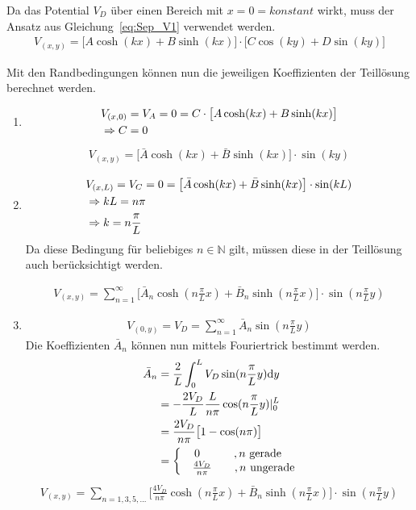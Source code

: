 Da das Potential $V_D$ über einen Bereich mit $x = 0 = konstant$ wirkt, muss der Ansatz aus Gleichung~\ref{eq:Sep_V1} verwendet werden. 
\begin{align}
	V_{(x,y)} = \bigl[A\cosh(kx) + B\sinh(kx)\bigr] \cdot \bigl[C\cos(ky) + D\sin(ky)\bigr]
\end{align}

Mit den Randbedingungen können nun die jeweiligen Koeffizienten der Teillösung berechnet werden. 

\begin{enumerate}
	\item \begin{align}
		&V_{(x,0)} = V_A = 0 = C \cdot \bigl[A \cosh(kx) + B \sinh(kx)\bigr] \\
		&\Rightarrow C = 0 \notag
	\end{align}
	\begin{align}
		V_{(x,y)} = \bigl[\bar{A} \cosh(kx) + \bar{B} \sinh(kx)\bigr] \cdot \sin(ky)
	\end{align}
	
	\item \begin{align}
		&V_{(x,L)} = V_C = 0 = \bigl[\bar{A} \cosh(kx) + \bar{B} \sinh(kx)\bigr] \cdot \sin(kL) \\
		&\Rightarrow kL = n \pi \notag \\
		&\Rightarrow k = n \frac{\pi}{L} \notag
	\end{align}
	Da diese Bedingung für beliebiges $n \in \mathbb{N}$ gilt, müssen diese in der Teillösung auch berücksichtigt werden. 
	
	\begin{align}
		V_{(x,y)} = \sum_{n = 1}^{\infty} \bigl[\bar{A}_n \cosh(n \frac{\pi}{L} x) + \bar{B}_n \sinh(n \frac{\pi}{L} x) \bigr] \cdot \sin(n \frac{\pi}{L} y)
	\end{align}
	
	\item \begin{align}
		V_{(0,y)} = V_D = \sum_{n = 1}^{\infty} \bar{A}_n \sin(n \frac{\pi}{L} y)
	\end{align}
	Die Koeffizienten $\bar{A}_n$ können nun mittels \glqq Fouriertrick\grqq{} bestimmt werden. 
	\begin{align}
		\bar{A}_n &= \frac{2}{L} \int_{0}^{L} V_D \sin(n \frac{\pi}{L} y) \mathrm{d}y \\
		&= - \frac{2V_D}{L} \frac{L}{n \pi} \cos(n \frac{\pi}{L} y) |_0^L \notag \\
		&= \frac{2V_D}{n \pi} \bigl[ 1 - \cos(n \pi) \bigr] \notag \\
		&= \biggl\{ \begin{matrix}
			0 \qquad \quad, n~\mathrm{gerade} \\
			~~~\frac{4V_D}{n \pi} \qquad , n~\mathrm{ungerade}
		\end{matrix} \notag
	\end{align}
	\begin{align}
		V_{(x,y)} = \sum_{n = 1,3,5,...} \biggl[ \frac{4V_D}{n \pi} \cosh(n \frac{\pi}{L} x) + \bar{B}_n \sinh(n \frac{\pi}{L} x) \biggr] \cdot \sin(n \frac{\pi}{L} y)
	\end{align}
	

\end{enumerate}
